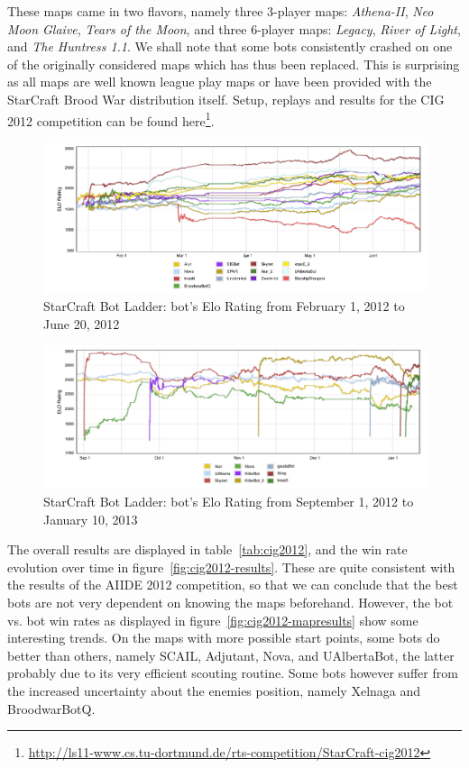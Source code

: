 \documentclass[journal]{IEEEtran}
\begin{document}
These maps came in two flavors, namely three 3-player maps:
\emph{Athena-II}, \emph{Neo Moon Glaive}, \emph{Tears of the Moon},
and three 6-player maps:
\emph{Legacy}, \emph{River of Light}, and 
\emph{The Huntress 1.1}. 
We shall note that some bots consistently crashed on one
of the originally considered maps which has thus been replaced.
This is surprising as all maps are well known league play maps
or have been provided with the StarCraft Brood War distribution
itself.
Setup, replays and results for the CIG 2012 competition can be found
here\footnote{\url{http://ls11-www.cs.tu-dortmund.de/rts-competition/StarCraft-cig2012}}.

\begin{figure}[tb]
    \centering
    \includegraphics[width=\textwidth]{figures/botLadder1.pdf}
    \caption{StarCraft Bot Ladder: bot's Elo Rating from February 1, 2012 to June 20, 2012}
    \label{fig:botLadder1}
\end{figure}

\begin{figure}[tb]
    \centering
    \includegraphics[width=\textwidth]{figures/botLadder2.pdf}
    \caption{StarCraft Bot Ladder: bot's Elo Rating from September 1, 2012 to January 10, 2013}
    \label{fig:botLadder2}
\end{figure}

The overall results are displayed in table~\ref{tab:cig2012},
and the win rate evolution over time in figure~\ref{fig:cig2012-results}.
These are quite consistent with the results of the AIIDE 2012 competition,
so that we can conclude that the best bots are not very dependent on 
knowing the maps beforehand. However, the bot vs. bot win rates as
displayed in figure~\ref{fig:cig2012-mapresults} show some interesting
trends. On the maps with more possible start points, some bots do 
better than others, namely SCAIL, Adjutant, Nova, and UAlbertaBot,
the latter probably due to its very efficient scouting routine.
Some bots however suffer from the increased uncertainty about
the enemies position, namely Xelnaga and BroodwarBotQ.
\end{document}
